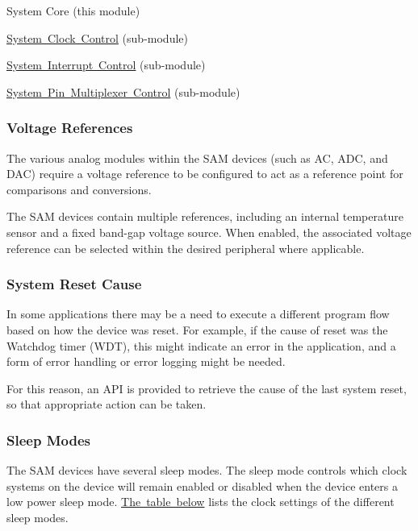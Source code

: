 \begin{DoxyItemize}
\item System Core (this module)
\item \mbox{\hyperlink{group__asfdoc__sam0__system__clock__group}{System Clock Control}} (sub-\/module)
\item \mbox{\hyperlink{group__asfdoc__sam0__system__interrupt__group}{System Interrupt Control}} (sub-\/module)
\item \mbox{\hyperlink{group__asfdoc__sam0__system__pinmux__group}{System Pin Multiplexer Control}} (sub-\/module)
\end{DoxyItemize}\hypertarget{group__asfdoc__sam0__system__group_asfdoc_sam0_system_module_overview_vref}{}\subsubsection{Voltage References}\label{group__asfdoc__sam0__system__group_asfdoc_sam0_system_module_overview_vref}
The various analog modules within the S\+AM devices (such as AC, A\+DC, and D\+AC) require a voltage reference to be configured to act as a reference point for comparisons and conversions.

The S\+AM devices contain multiple references, including an internal temperature sensor and a fixed band-\/gap voltage source. When enabled, the associated voltage reference can be selected within the desired peripheral where applicable.\hypertarget{group__asfdoc__sam0__system__group_asfdoc_sam0_system_module_overview_reset_cause}{}\subsubsection{System Reset Cause}\label{group__asfdoc__sam0__system__group_asfdoc_sam0_system_module_overview_reset_cause}
In some applications there may be a need to execute a different program flow based on how the device was reset. For example, if the cause of reset was the Watchdog timer (W\+DT), this might indicate an error in the application, and a form of error handling or error logging might be needed.

For this reason, an A\+PI is provided to retrieve the cause of the last system reset, so that appropriate action can be taken.\hypertarget{group__asfdoc__sam0__system__group_asfdoc_sam0_system_module_overview_sleep_mode}{}\subsubsection{Sleep Modes}\label{group__asfdoc__sam0__system__group_asfdoc_sam0_system_module_overview_sleep_mode}
The S\+AM devices have several sleep modes. The sleep mode controls which clock systems on the device will remain enabled or disabled when the device enters a low power sleep mode. \mbox{\hyperlink{group__asfdoc__sam0__system__group_asfdoc_sam0_system_module_sleep_mode_table}{The table below}} lists the clock settings of the different sleep modes.


